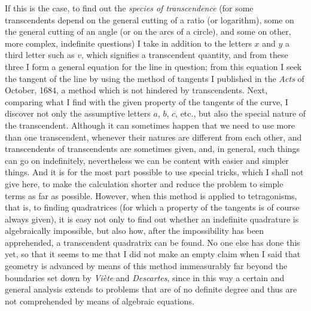 \documentclass[polutonikogreek,english,twoside,openright]{article}
\begin{document}
If this is the case, to find out the {\em species of transcendence}
(for some transcendents depend on the general cutting of a ratio (or
logarithm), some on the general cutting of an angle (or on the arcs of
a circle), and some on other, more complex, indefinite questions) I
take in addition to the letters $x$ and $y$ a third letter such as
$v$, which signifies a transcendent quantity, and from these three I
form a general equation for the line in question; from this equation I seek the tangent of the
line by using the method of tangents I published in the {\em Acts} of
October, 1684, a method which is not hindered by transcendents.  Next,
comparing what I find with the given property of the tangents of the
curve, I discover not only the assumptive letters $a$, $b$, $c$, etc.,
but also the special nature of the transcendent.  Although it can
sometimes happen that we need to use more than one transcendent,
whenever their natures are different from each other, and
transcendents of transcendents are sometimes given, and, in general,
such things can go on indefinitely, nevertheless we can be content
with easier and simpler things.  And it is for the most part possible
to use special tricks, which I shall not give here, to make the
calculation shorter and reduce the problem to simple terms as far as
possible.  However, when this method is applied to tetragonisms, that
is, to finding quadratrices (for which a property of the tangents is
of course always given), it is easy not only to find out whether an
indefinite quadrature is algebraically impossible, but also how, after
the impossibility has been apprehended, a transcendent quadratrix can
be found.  No one else has done this yet, so that it seems to me that
I did not make an empty claim when I said that geometry is advanced by
means of this method immeasurably far beyond the boundaries set down
by {\em Vi\`{e}te} and {\em Descartes}, since in this way a certain
and general analysis extends to problems that are of no definite
degree and thus are not comprehended by means of algebraic equations.
\end{document}
